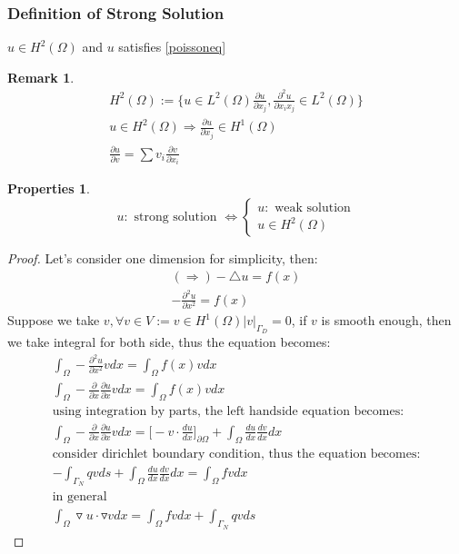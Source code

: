 \documentclass[a4paper,12pt]{article}
\newtheorem{remark}{Remark}[]
\newtheorem{prop}{Properties}
\begin{document}
\subsubsection{Definition of Strong Solution}
$u \in H^2(\Omega)$ and $u$ satisfies \eqref{poissoneq}
\begin{remark}
	\begin{equation}\nonumber
	\begin{aligned}
	H^2(\Omega):= \{ u\in L^2(\Omega) \frac{\partial u}{\partial x_j},\frac{\partial^2 u}{\partial x_i x_j} \in L^2(\Omega)\}\\
	u \in H^2(\Omega) \Rightarrow \frac{\partial u}{\partial x_j} \in H^1(\Omega)\\
	\frac{\partial u}{\partial v} = \sum v_i \frac{\partial v}{\partial x_i}
	\end{aligned}
	\end{equation}
\end{remark}
\begin{prop}
	\begin{equation}\nonumber
	u: \text{ strong solution } \Leftrightarrow \begin{cases}
	u: \text{ weak solution}\\
	u \in H^2(\Omega)
	\end{cases}
	\end{equation}
\end{prop}
\begin{proof}
	Let's consider one dimension for simplicity, then:
	\begin{equation*}
	\begin{aligned}
	(\Rightarrow)
	-\triangle u = f(x)\\
	-\frac{\partial^2 u}{\partial x^2} = f(x)
	\end{aligned}
	\end{equation*}
	Suppose we take $v,\forall v \in V:={v \in H^1(\Omega)|v|_{\Gamma_D} = 0}$, if $v$ is smooth enough, then we take integral for both side, thus the equation becomes:
	\begin{equation*}
	\begin{aligned}
	\int_\Omega -\frac{\partial^2 u}{\partial x^2} v dx = \int_\Omega f(x) v dx\\
	\int_\Omega -\frac{\partial}{\partial x}\frac{\partial u}{\partial x} v dx = \int_\Omega f(x) v dx\\
	\text{using integration by parts, the left handside equation becomes:}\\
	\int_\Omega -\frac{\partial}{\partial x}\frac{\partial u}{\partial x} v dx = \bigg[-v \cdot \frac{du}{dx}\bigg]_{\partial\Omega} + \int_\Omega \frac{du}{dx}\frac{dv}{dx} dx\\
	\text{consider dirichlet boundary condition, thus the equation becomes:}\\
	-\int_{\Gamma_N} qv ds + \int_\Omega \frac{du}{dx}\frac{dv}{dx} dx = \int_\Omega fv dx\\
	\text{in general}\\
	\int_\Omega \triangledown u \cdot \triangledown v dx = \int_\Omega fv dx + \int_{\Gamma_N} qv ds
	\end{aligned}
	\end{equation*}
\end{proof}
\end{document}
